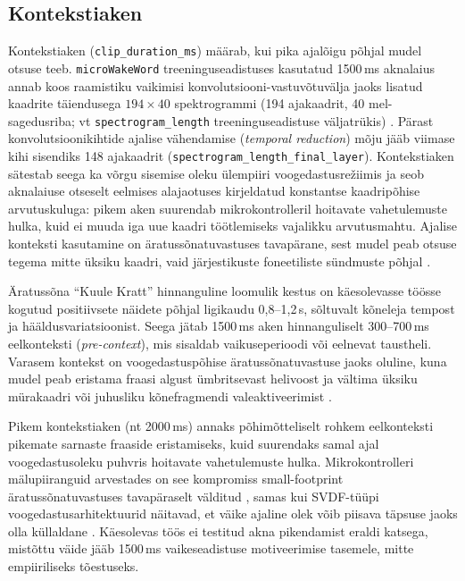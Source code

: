 \subsection{Kontekstiaken}
\label{subsec:clip-duration}

Kontekstiaken (\texttt{clip\_duration\_ms}) määrab, kui pika ajalõigu põhjal mudel otsuse teeb. \texttt{microWakeWord} treeninguseadistuses kasutatud 1500\,ms aknalaius annab koos raamistiku vaikimisi konvolutsiooni-vastuvõtu\-välja jaoks lisatud kaadrite täiendusega $194 \times 40$ spektrogrammi (194 ajakaadrit, 40 mel-sagedusriba; vt \texttt{spectrogram\_length} treeninguseadistuse väljatrükis) \cite{microwakeword2026}. Pärast konvolutsioonikihtide ajalise vähendamise (\emph{temporal reduction}) mõju jääb viimase kihi sisendiks 148 ajakaadrit (\texttt{spectrogram\_length\_final\_layer}). Kontekstiaken sätestab seega ka võrgu sisemise oleku ülempiiri voogedastusrežiimis ja seob aknalaiuse otseselt eelmises alajaotuses kirjeldatud konstantse kaadripõhise arvutuskuluga: pikem aken suurendab mikrokontrolleril hoitavate vahetulemuste hulka, kuid ei muuda iga uue kaadri töötlemiseks vajalikku arvutusmahtu. Ajalise konteksti kasutamine on äratussõnatuvastuses tavapärane, sest mudel peab otsuse tegema mitte üksiku kaadri, vaid järjestikuste foneetiliste sündmuste põhjal \cite{sainath2015cnn,lopezespejo2021deepkws}.

Äratussõna \enquote{Kuule Kratt} hinnanguline loomulik kestus on käesolevasse töösse kogutud positiivsete näidete põhjal ligikaudu 0{,}8--1{,}2\,s, sõltuvalt kõneleja tempost ja hääldusvariatsioonist. Seega jätab 1500\,ms aken hinnanguliselt 300--700\,ms eelkonteksti (\emph{pre-context}), mis sisaldab vaikuseperioodi või eelnevat taustheli. Varasem kontekst on voogedastuspõhise äratussõnatuvastuse jaoks oluline, kuna mudel peab eristama fraasi algust ümbritsevast helivoost ja vältima üksiku mürakaadri või juhusliku kõnefragmendi valeaktiveerimist \cite{lopezespejo2021deepkws}.

Pikem kontekstiaken (nt 2000\,ms) annaks põhimõtteliselt rohkem eelkonteksti pikemate sarnaste fraaside eristamiseks, kuid suurendaks samal ajal voogedastusoleku puhvris hoitavate vahetulemuste hulka. Mikrokontrolleri mälupiiranguid arvestades on see kompromiss small-footprint äratussõnatuvastuses tavapäraselt välditud \cite{chen2014smallfootprint}, samas kui SVDF-tüüpi voogedastusarhitektuurid näitavad, et väike ajaline olek võib piisava täpsuse jaoks olla küllaldane \cite{alvarez2019svdf}. Käesolevas töös ei testitud akna pikendamist eraldi katsega, mistõttu väide jääb 1500\,ms vaikeseadistuse motiveerimise tasemele, mitte empiiriliseks tõestuseks.

